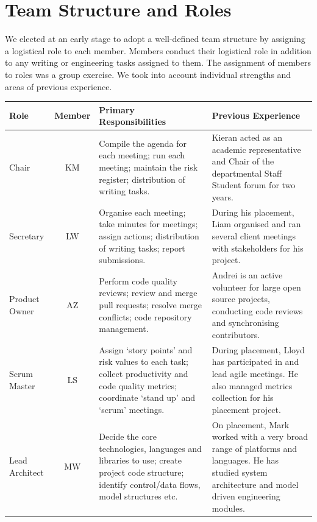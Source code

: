 \documentclass[twoside,a4paper,12pt]{article}
\begin{document}
	\newpage
	\section{Team Structure and Roles}
	\label{team_structure}
	
	We elected at an early stage to adopt a well-defined team structure by assigning a logistical role to each member. Members conduct their logistical role in addition to any writing or engineering tasks assigned to them. The assignment of members to roles was a group exercise. We took into account individual strengths and areas of previous experience. 
	
	\begin{table}[h!]
		\begin{tabularx}{\textwidth}{|p{2cm}|c|Y|Y|}
		\hline
			\textbf{Role} & \textbf{Member} & \textbf{Primary Responsibilities} & \textbf{Previous Experience} \\
		\hline
		Chair & 
		KM & 
		Compile the agenda for each meeting; run each meeting; maintain the risk register; distribution of writing tasks. &
		Kieran acted as an academic representative and Chair of the departmental Staff Student forum for two years. \\
		\hline
		Secretary & 
		LW & 
		Organise each meeting; take minutes for meetings; assign actions; distribution of writing tasks; report submissions. & 
		During his placement, Liam organised and ran several client meetings with stakeholders for his project. \\
		\hline
		Product Owner & 
		AZ & 
		Perform code quality reviews; review and merge pull requests; resolve merge conflicts; code repository management. & 
		Andrei is an active volunteer for large open source projects, conducting code reviews and synchronising contributors. \\
		\hline
		Scrum Master & 
		LS & 
		Assign `story points' and risk values to each task; collect productivity and code quality metrics; coordinate `stand up' and `scrum' meetings. & 
		During placement, Lloyd has participated in and lead agile meetings. He also managed metrics collection for his placement project. \\
		\hline
		Lead Architect & 
		MW & 
		Decide the core technologies, languages and libraries to use; create project code structure; identify control/data flows, model structures etc. & 
		On placement, Mark worked with a very broad range of platforms and languages. He has studied system architecture and model driven engineering modules.\\

\end{tabularx}
\end{table}
\end{document}
